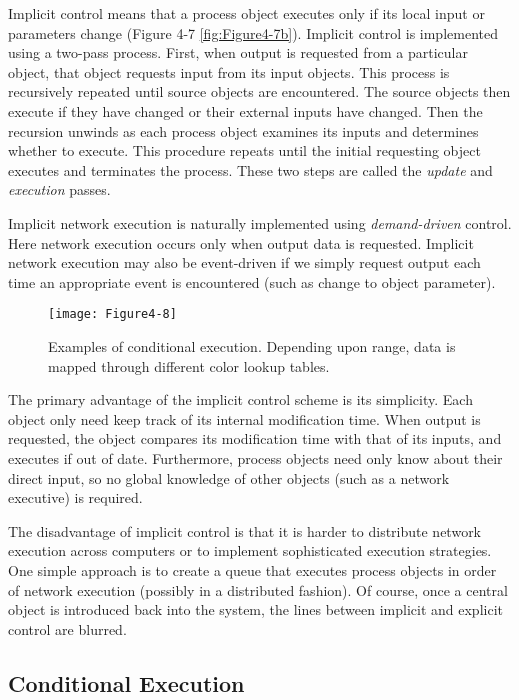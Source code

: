 Implicit control means that a process object executes only if its local input or parameters change (Figure 4-7 \ref{fig:Figure4-7b}). Implicit control is implemented using a two-pass process. First, when output is requested from a particular object, that object requests input from its input objects. This process is recursively repeated until source objects are encountered. The source objects then execute if they have changed or their external inputs have changed. Then the recursion unwinds as each process object examines its inputs and determines whether to execute. This procedure repeats until the initial requesting object executes and terminates the process. These two steps are called the \emph{update} and \emph{execution} passes.

Implicit network execution is naturally implemented using \emph{demand-driven} control. Here network execution occurs only when output data is requested. Implicit network execution may also be event-driven if we simply request output each time an appropriate event is encountered (such as change to object parameter).

\begin{figure}[!htb]
  \centering
  \texttt{[image: Figure4-8]}\\
  \caption{Examples of conditional execution. Depending upon range, data is mapped through different color lookup tables.}\label{fig:Figure4-8}
\end{figure}

The primary advantage of the implicit control scheme is its simplicity. Each object only need keep track of its internal modification time. When output is requested, the object compares its modification time with that of its inputs, and executes if out of date. Furthermore, process objects need only know about their direct input, so no global knowledge of other objects (such as a network executive) is required.

The disadvantage of implicit control is that it is harder to distribute network execution across computers or to implement sophisticated execution strategies. One simple approach is to create a queue that executes process objects in order of network execution (possibly in a distributed fashion). Of course, once a central object is introduced back into the system, the lines between implicit and explicit control are blurred.

\subsection{Conditional Execution}
\label{subsec:conditional_execution}

